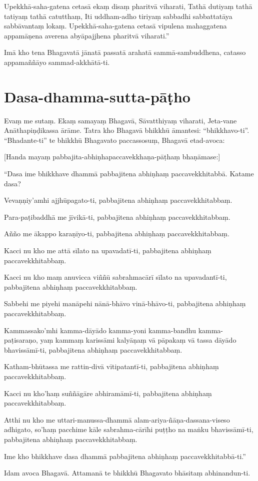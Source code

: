 Upekkhā-saha-gatena cetasā ekaṃ disaṃ pharitvā viharati, Tathā dutiyaṃ tathā
tatiyaṃ tathā catutthaṃ, Iti uddham-adho tiriyaṃ sabbadhi sabbattatāya
sabbāvantaṃ lokaṃ. Upekkhā-saha-gatena cetasā vipulena mahaggatena appamāṇena
averena abyāpajjhena pharitvā viharati.”

Imā kho tena Bhagavatā jānatā passatā arahatā sammā-sambuddhena, catasso
appamaññāyo sammad-akkhātā-ti.


\section{Dasa-dhamma-sutta-pāṭho}


Evaṃ me sutaṃ. Ekaṃ samayaṃ Bhagavā, Sāvatthiyaṃ viharati, Jeta-vane
Anāthapiṇḍikassa ārāme. Tatra kho Bhagavā bhikkhū āmantesi: “bhikkhavo-ti”.
“Bhadante-ti” te bhikkhū Bhagavato paccassosuṃ, Bhagavā etad-avoca:

[Handa mayaṃ pabbajita-abhiṇhapaccavekkhaṇa-pāṭhaṃ bhaṇāmase:]

“Dasa ime bhikkhave dhammā pabbajitena abhiṇhaṃ paccavekkhitabbā. Katame dasa?

Vevaṇṇiy’amhi ajjhūpagato-ti, pabbajitena abhiṇhaṃ paccavekkhitabbaṃ.

Para-paṭibaddhā me jīvikā-ti, pabbajitena abhiṇhaṃ paccavekkhitabbaṃ.

Añño me ākappo karaṇīyo-ti, pabbajitena abhiṇhaṃ paccavekkhitabbaṃ.

Kacci nu kho me attā sīlato na upavadatī-ti, pabbajitena abhiṇhaṃ paccavekkhitabbaṃ.

Kacci nu kho maṃ anuvicca viññū sabrahmacārī sīlato na upavadantī-ti, pabbajitena abhiṇhaṃ paccavekkhitabbaṃ.

Sabbehi me piyehi manāpehi nānā-bhāvo vinā-bhāvo-ti, pabbajitena abhiṇhaṃ paccavekkhitabbaṃ.

Kammassako’mhi kamma-dāyādo kamma-yoni kamma-bandhu kamma-paṭisaraṇo, yaṃ kammaṃ karissāmi kalyāṇaṃ vā pāpakaṃ vā tassa dāyādo bhavissāmī-ti, pabbajitena abhiṇhaṃ paccavekkhitabbaṃ.

Katham-bhūtassa me rattin-divā vītipatantī-ti, pabbajitena abhiṇhaṃ paccavekkhitabbaṃ.

Kacci nu kho’haṃ suññāgāre abhiramāmī-ti, pabbajitena abhiṇhaṃ paccavekkhitabbaṃ.

Atthi nu kho me uttari-manussa-dhammā alam-ariya-ñāṇa-dassana-viseso adhigato, so’haṃ pacchime kāle sabrahma-cārīhi puṭṭho na maṅku bhavissāmī-ti, pabbajitena abhiṇhaṃ paccavekkhitabbaṃ.

Ime kho bhikkhave dasa dhammā pabbajitena abhiṇhaṃ paccavekkhitabbā-ti.”

Idam avoca Bhagavā. Attamanā te bhikkhū Bhagavato bhāsitaṃ abhinandun-ti.


